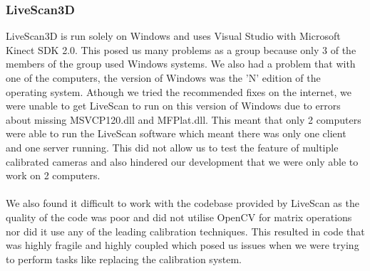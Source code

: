 \documentclass{article}
\begin{document}
\subsubsection{LiveScan3D}
LiveScan3D is run solely on Windows and uses Visual Studio with Microsoft Kinect SDK 2.0. This posed us many problems as a group because only 3 of the members of the group used Windows systems. We also had a problem that with one of the computers, the version of Windows was the 'N' edition of the operating system. Athough we tried the recommended fixes on the internet, we were unable to get LiveScan to run on this version of Windows due to errors about missing MSVCP120.dll and MFPlat.dll. This meant that only 2 computers were able to run the LiveScan software which meant there was only one client and one server running. This did not allow us to test the feature of multiple calibrated cameras and also hindered our development that we were only able to work on 2  computers.
\\\\
We also found it difficult to work with the codebase provided by LiveScan as the quality of the code was poor and did not utilise OpenCV for matrix operations nor did it use any of the leading calibration techniques. This resulted in code that was highly fragile and highly coupled which posed us issues when we were trying to perform tasks like replacing the calibration system.
\end{document}
